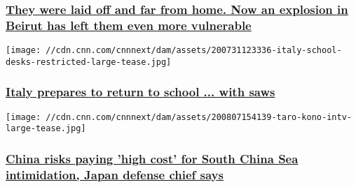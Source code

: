 \hypertarget{they-were-laid-off-and-far-from-home-now-an-explosion-in-beirut-has-left-them-even-more-vulnerable-1}{%
\subsubsection{\texorpdfstring{\href{/2020/08/07/africa/beirut-domestic-workers-ethiopia-intl/index.html}{They
were laid off and far from home. Now an explosion in Beirut has left
them even more
vulnerable}}{They were laid off and far from home. Now an explosion in Beirut has left them even more vulnerable}}\label{they-were-laid-off-and-far-from-home-now-an-explosion-in-beirut-has-left-them-even-more-vulnerable-1}}

\href{/2020/08/07/europe/italy-school-return-sawing-up-desks-coronavirus-intl/index.html}{}

\texttt{[image: //cdn.cnn.com/cnnnext/dam/assets/200731123336-italy-school-desks-restricted-large-tease.jpg]}

\hypertarget{italy-prepares-to-return-to-school--with-saws-1}{%
\subsubsection{\texorpdfstring{\href{/2020/08/07/europe/italy-school-return-sawing-up-desks-coronavirus-intl/index.html}{Italy
prepares to return to school ... with
saws}}{Italy prepares to return to school ... with saws}}\label{italy-prepares-to-return-to-school--with-saws-1}}

\href{/2020/08/07/asia/japan-defense-minister-interview-south-china-sea-intl-hnk/index.html}{}

\texttt{[image: //cdn.cnn.com/cnnnext/dam/assets/200807154139-taro-kono-intv-large-tease.jpg]}

\hypertarget{china-risks-paying-high-cost-for-south-china-sea-intimidation-japan-defense-chief-says}{%
\subsubsection{\texorpdfstring{\href{/2020/08/07/asia/japan-defense-minister-interview-south-china-sea-intl-hnk/index.html}{China
risks paying 'high cost' for South China Sea intimidation, Japan defense
chief
says}}{China risks paying 'high cost' for South China Sea intimidation, Japan defense chief says}}\label{china-risks-paying-high-cost-for-south-china-sea-intimidation-japan-defense-chief-says}}

\href{/2020/08/07/asia/south-korea-politician-dress-intl-hnk/index.html}{}

